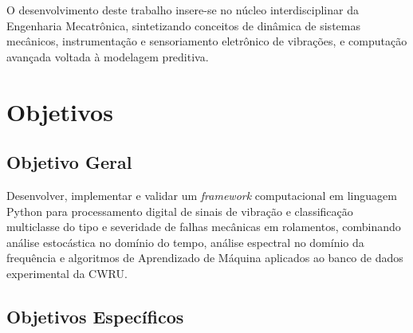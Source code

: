 O desenvolvimento deste trabalho insere-se no núcleo interdisciplinar da Engenharia Mecatrônica, sintetizando conceitos de dinâmica de sistemas mecânicos, instrumentação e sensoriamento eletrônico de vibrações, e computação avançada voltada à modelagem preditiva.

\section{Objetivos}
\label{sec:objetivos}

\subsection{Objetivo Geral}

Desenvolver, implementar e validar um \textit{framework} computacional em linguagem Python para processamento digital de sinais de vibração e classificação multiclasse do tipo e severidade de falhas mecânicas em rolamentos, combinando análise estocástica no domínio do tempo, análise espectral no domínio da frequência e algoritmos de Aprendizado de Máquina aplicados ao banco de dados experimental da CWRU.

\subsection{Objetivos Específicos}

